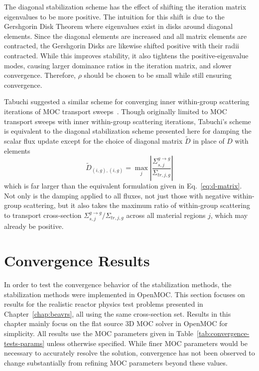 
The diagonal stabilization scheme has the effect of shifting the iteration matrix eigenvalues to be more positive. The intuition for this shift is due to the Gershgorin Disk Theorem where eigenvalues exist in disks around diagonal elements. Since the diagonal elements are increased and all matrix elements are contracted, the Gershgorin Disks are likewise shifted positive with their radii contracted. While this improves stability, it also tightens the positive-eigenvalue modes, causing larger dominance ratios in the iteration matrix, and slower convergence. Therefore, $\rho$ should be chosen to be small while still ensuring convergence. 

Tabuchi suggested a similar scheme for converging inner within-group scattering iterations of \ac{MOC} transport sweeps~\cite{ty-solution}. Though originally limited to \ac{MOC} transport sweeps with inner within-group scattering iterations, Tabuchi's scheme is equivalent to the diagonal stabilization scheme presented here for damping the scalar flux update except for the choice of diagonal matrix $\tilde{D}$ in place of $D$ with elements
\begin{equation}
\tilde{D}_{(i,g), (i,g)} = \max_j \left|\frac{\Sigma_{s,j}^{g \rightarrow g}}{\Sigma_{\textit{tr}, j, g}} \right|
\end{equation}
which is far larger than the equivalent formulation given in Eq.~\ref{eq:d-matrix}. Not only is the damping applied to all fluxes, not just those with negative within-group scattering, but it also takes the maximum ratio of within-group scattering to transport cross-section $\Sigma_{s,j}^{g \rightarrow g} / \Sigma_{\textit{tr}, j, g}$ across all material regions $j$, which may already be positive.

\section{Convergence Results}
\label{sec:convergence-results}

In order to test the convergence behavior of the stabilization methods, the stabilization methods were implemented in OpenMOC. This section focuses on results for the realistic reactor physics test problems presented in Chapter~\ref{chap:beavrs}, all using the same cross-section set. Results in this chapter mainly focus on the flat source 3D \ac{MOC} solver in OpenMOC for simplicity. All results use the \ac{MOC} parameters given in Table~\ref{tab:convergence-tests-params} unless otherwise specified. While finer \ac{MOC} parameters would be necessary to accurately resolve the solution, convergence has not been observed to change substantially from refining \ac{MOC} parameters beyond these values.

